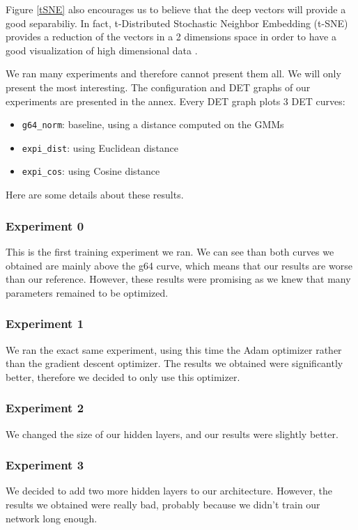 \documentclass[conference]{IEEEtran}
\begin{document}
Figure \ref{tSNE} also encourages us to believe that the deep vectors will provide a good separabiliy. In fact, t-Distributed Stochastic Neighbor Embedding (t-SNE) provides a reduction of the vectors in a 2 dimensions space in order to have a good visualization of high dimensional data \cite{ictdbid:2777}.

We ran many experiments and therefore cannot present them all. We will only present the most interesting. The configuration and DET graphs of our experiments are presented in the annex. Every DET graph plots 3 DET curves:
\begin{itemize}
\item \texttt{g64\_norm}: baseline, using a distance computed on the GMMs
\item \texttt{expi\_dist}: using Euclidean distance
\item \texttt{expi\_cos}: using Cosine distance
\end{itemize}
Here are some details about these results.

\subsubsection{Experiment 0} This is the first training experiment we ran. We can see than both curves we obtained are mainly above the g64 curve, which means that our results are worse than our reference. However, these results were promising as we knew that many parameters remained to be optimized.

\subsubsection{Experiment 1} We ran the exact same experiment, using this time the Adam optimizer rather than the gradient descent optimizer. The results we obtained were significantly better, therefore we decided to only use this optimizer.

\subsubsection{Experiment 2} We changed the size of our hidden layers, and our results were slightly better.

\subsubsection{Experiment 3} We decided to add two more hidden layers to our architecture. However, the results we obtained were really bad, probably because we didn't train our network long enough.
\end{document}
